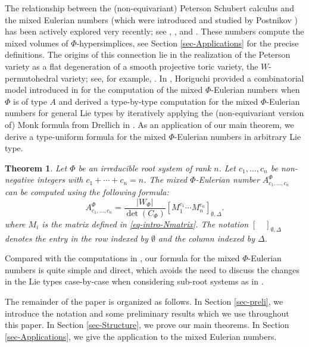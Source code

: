 \documentclass[11pt, letterpaper]{amsart}
\numberwithin{equation}{section}
\newtheorem{theorem}{Theorem}[section]
\begin{document}
The relationship between the (non-equivariant) Peterson Schubert calculus and the mixed Eulerian numbers (which
were introduced and studied by Postnikov
\cite{postnikov2009permutohedra}) has been actively explored very recently; see \cite{Berget2023log}, \cite{Nadeau2023permutahedral}, and \cite{Horiguchi2024mixed}. These numbers compute the mixed volumes of $\Phi$-hypersimplices, see Section \ref{sec-Applications} for the precise definitions. The origins of this connection lie in the realization of the Peterson variety as a flat degeneration of a smooth projective toric variety, the $W$-permutohedral variety; see, for example, 
\cite{Abe2020Geometry,Klyachko1985orbits,Klyachko1995toric}. In \cite{Horiguchi2024mixed}, Horiguchi provided a combinatorial model introduced in \cite{abe2024geometry} for the computation of the mixed $\Phi$-Eulerian numbers when $\Phi$ is of type $A$ and derived a type-by-type computation for the mixed $\Phi$-Eulerian numbers for general Lie types by iteratively applying the (non-equivariant version of) Monk formula from Drellich in \cite{drellich2015monk}. As an application of our main theorem, we derive a type-uniform formula for the mixed $\Phi$-Eulerian numbers in arbitrary Lie type.

\begin{theorem}\label{thm-introMEN}
    Let \(\Phi\) be an irreducible root system of rank $n$. Let \(c_1, \ldots, c_n\) be non-negative integers with \(c_1 + \cdots + c_n = n\).  
The mixed ${\Phi}$-Eulerian number $A_{c_{1}, \dots, c_{n}}^{\Phi}$ can be computed using the following formula:
\[
A_{c_{1},\ldots,c_{n}}^{\Phi} = \frac{|W_{\Phi}|}{\det(C_\Phi)} 
\left[ M_1^{c_{1}} \cdots M_n^{c_{n}} \right]_{\emptyset, \Delta}.
\]
where $M_i$ is the matrix defined in \eqref{eq-intro-Nmatrix}.
The notation
\(
[\quad]_{\emptyset, \Delta}
\)
denotes the entry in the row indexed by $\emptyset$ and the column indexed by $\Delta$.
\end{theorem}

Compared with the computations in \cite{Horiguchi2024mixed}, our formula for the mixed $\Phi$-Eulerian numbers is quite simple and direct, which avoids the need to discuss the changes in the Lie types case-by-case when considering sub-root systems as in \cite[Section 7]{Horiguchi2024mixed}.

The remainder of the paper is organized as follows. In Section \ref{sec-preli}, we introduce the notation and some preliminary results which we use throughout this paper. In Section \ref{sec-Structure}, we prove our main theorems. In Section \ref{sec-Applications}, we give the application to the mixed Eulerian numbers. 
\end{document}
